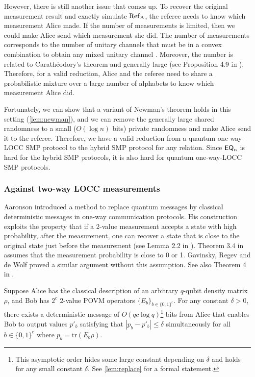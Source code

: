 However, there is still another issue that comes up. To recover the original measurement result and exactly simulate $\rm{Ref}_A$, 
the referee needs to know which measurement Alice made. If the number of measurements is limited, then we could make Alice send which measurement she did. The number of measurements corresponds to the number of unitary channels that must be in a convex combination to obtain any mixed unitary channel \cite{CD04,DPP05}. Moreover, the number is related to Carath{\'e}odory’s theorem \cite{Car11} and generally large (see Proposition 4.9 in \cite{Wat18}). Therefore, for a valid reduction, Alice and the referee need to share a probabilistic mixture over a large number of alphabets to know which measurement Alice did.

Fortunately, we can show that a variant of Newman's theorem \cite{New91} holds in this setting (\cref{lem:newman}), and we can remove the generally large shared randomness to a small ($O(\log n)$ bits) private randomness and make Alice send it to the referee. Therefore, we have a valid reduction from a quantum one-way-LOCC SMP protocol to the hybrid SMP protocol for any relation. Since $\mathsf{EQ}_n$ is hard for the hybrid SMP protocols, it is also hard for quantum one-way-LOCC SMP protocols.

\subsubsection*{Against two-way LOCC measurements}

Aaronson \cite{Aar05} introduced a method to replace quantum messages by classical deterministic messages in one-way communication protocols. His construction exploits the property that if a 2-value measurement accepts a state with high probability, after the measurement, one can recover a state that is close to the original state just before the measurement (see Lemma 2.2 in \cite{Aar05}). Theorem 3.4 in \cite{Aar05} assumes that the measurement probability is close to 0 or 1.  Gavinsky, Regev and de Wolf \cite{GRdW08} proved a similar argument without this assumption. See also Theorem 4 in \cite{Aar18}.

\begin{theorem}
    Suppose Alice has the classical description of an arbitrary $q$-qubit density matrix $\rho$, and Bob has $2^c$ $2$-value POVM operators $\{E_b\}_{b \in \{0,1\}^c}$. For any constant $\delta >0$, there exists a deterministic message of $O(qc\log q)$\footnote{This asymptotic order hides some large constant depending on $\delta$ and holds for any small constant $\delta$. See \cref{lem:replace} for a formal statement.} bits from Alice that enables Bob to output values $p'_b$ satisfying that $|p_b-p'_b| \leq \delta$ simultaneously for all $b \in \{0,1\}^c$ where $p_b = \mathrm{tr}(E_b \rho)$.
\end{theorem}

